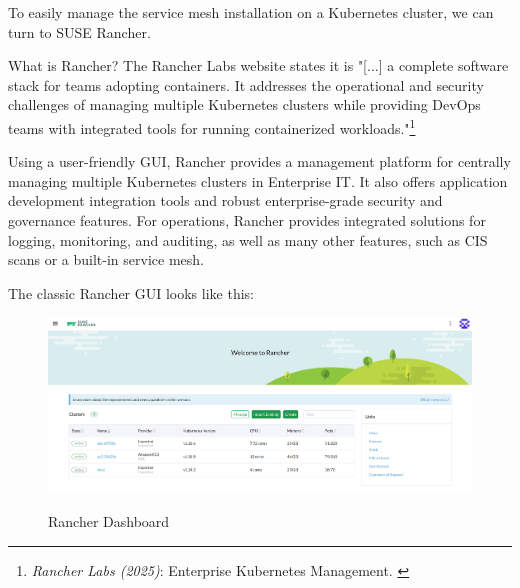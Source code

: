 To easily manage the service mesh installation on a Kubernetes cluster, we can turn to SUSE Rancher.

What is Rancher? The Rancher Labs website states it is "[...] a complete software stack for teams adopting containers. It addresses the operational and security challenges of managing multiple Kubernetes clusters while providing DevOps teams with integrated tools for running containerized workloads."\footnote{\textit{Rancher Labs (2025)}: Enterprise Kubernetes Management. \cite{rancher}}

Using a user-friendly GUI, Rancher provides a management platform for centrally managing multiple Kubernetes clusters in Enterprise IT. It also offers application development integration tools and robust enterprise-grade security and governance features. For operations, Rancher provides integrated solutions for logging, monitoring, and auditing, as well as many other features, such as CIS scans or a built-in service mesh.

The classic Rancher GUI looks like this:

\begin{figure}[H]
\centering
\caption {Rancher Dashboard}
\includegraphics[width=\linewidth]{images/rancher-dashboard.png}
\label{fig:rancherDashboard}
\end{figure}

